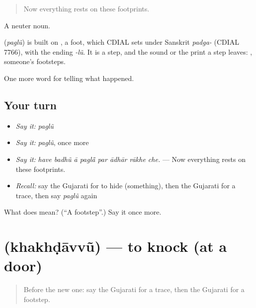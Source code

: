 \begin{quote}
Now everything rests on these footprints.
\end{quote}

A neuter noun.

\begin{cousinweb}
\textbf{} (\emph{paglũ}) is built on \textbf{}, a foot, which CDIAL sets under Sanskrit \emph{padga-} (CDIAL 7766), with the ending \emph{-lũ}. It is a step, and the sound or the print a step leaves: \textbf{ }, someone's footsteps.
\end{cousinweb}

\begin{grammarlens}[title={What you've built}]
One more word for telling what happened.
\end{grammarlens}

\subsection*{Your turn}
\begin{itemize}
\raggedright
  \item \emph{Say it:} \emph{paglũ}
  \item \emph{Say it:} \emph{paglũ}, once more
  \item \emph{Say it:} \emph{have badhũ ā paglā̃ par ādhār rākhe che.} — Now everything rests on these footprints.
  \item \emph{Recall:} say the Gujarati for to hide (something), then the Gujarati for a trace, then say \emph{paglũ} again
\end{itemize}

\begin{tcolorbox}[breakable,colback=teal!4,colframe=teal!35!black,title={Before you move on}]
What does  mean? (\textquotedblleft{}A footstep\textquotedblright{}.) Say it once more.
\end{tcolorbox}
\section[\texorpdfstring{\gu{ખખડાવવું} (khakhḍāvvũ)}{ખખડાવવું (khakhḍāvvũ)}]{ (khakhḍāvvũ) — to knock (at a door)}

\label{lesson:GU-C287-khakhdavvu}



\begin{quote}
Before the new one: say the Gujarati for a trace, then the Gujarati for a footstep.
\end{quote}

